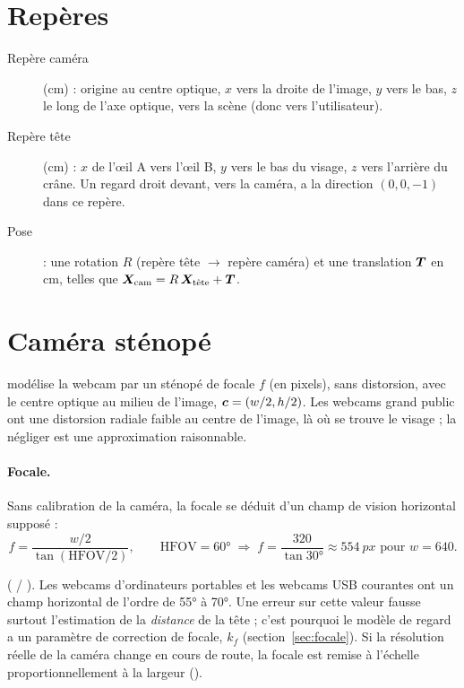 \section{Repères}

\begin{description}
  \item[Repère caméra] (cm) : origine au centre optique, $x$ vers la droite de l'image, $y$ vers le bas, $z$ le long de l'axe optique, vers la scène (donc vers l'utilisateur).
  \item[Repère tête] (cm) : $x$ de l'œil A vers l'œil B, $y$ vers le bas du visage, $z$ vers l'arrière du crâne. Un regard droit devant, vers la caméra, a la direction $(0, 0, -1)$ dans ce repère.
  \item[Pose] : une rotation $R$ (repère tête $\to$ repère caméra) et une translation $\bm{T}$ en cm, telles que $\bm{X}_\text{cam} = R\,\bm{X}_\text{tête} + \bm{T}$.
\end{description}

\section{Caméra sténopé}

 modélise la webcam par un sténopé de focale $f$ (en pixels), sans distorsion, avec le centre optique au milieu de l'image, $\bm{c} = (w/2, h/2)$. Les webcams grand public ont une distorsion radiale faible au centre de l'image, là où se trouve le visage ; la négliger est une approximation raisonnable.

\paragraph{Focale.} Sans calibration de la caméra, la focale se déduit d'un champ de vision horizontal supposé :
\begin{equation}
  f = \frac{w/2}{\tan(\text{HFOV}/2)}, \qquad \text{HFOV} = \ang{60} \;\Rightarrow\; f = \frac{320}{\tan \ang{30}} \approx \qty{554}{px} \text{ pour } w = 640 .
\end{equation}

\begin{origine}
 (\litt{} / \empi). Les webcams d'ordinateurs portables et les webcams USB courantes ont un champ horizontal de l'ordre de \ang{55} à \ang{70}. Une erreur sur cette valeur fausse surtout l'estimation de la \emph{distance} de la tête ; c'est pourquoi le modèle de regard a un paramètre de correction de focale, $k_f$ (section~\ref{sec:focale}). Si la résolution réelle de la caméra change en cours de route, la focale est remise à l'échelle proportionnellement à la largeur ().
\end{origine}

